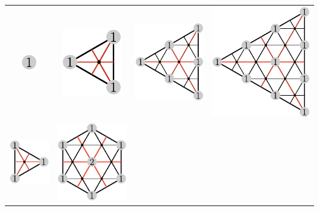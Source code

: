 \documentclass[11pt,oneside]{article}
\begin{document}
\begin{center}
\begin{tabular}{ c c c c }
  \includegraphics[scale=0.6]{images/sl3_weights_00.pdf}
& \includegraphics[scale=0.6]{images/sl3_weights_01.pdf}
& \includegraphics[scale=0.6]{images/sl3_weights_02.pdf}
& \includegraphics[scale=0.6]{images/sl3_weights_03.pdf} \\
  \includegraphics[scale=0.6]{images/sl3_weights_10.pdf}
& \includegraphics[scale=0.6]{images/sl3_weights_11.pdf}

\end{tabular}
\end{center}
\end{document}

